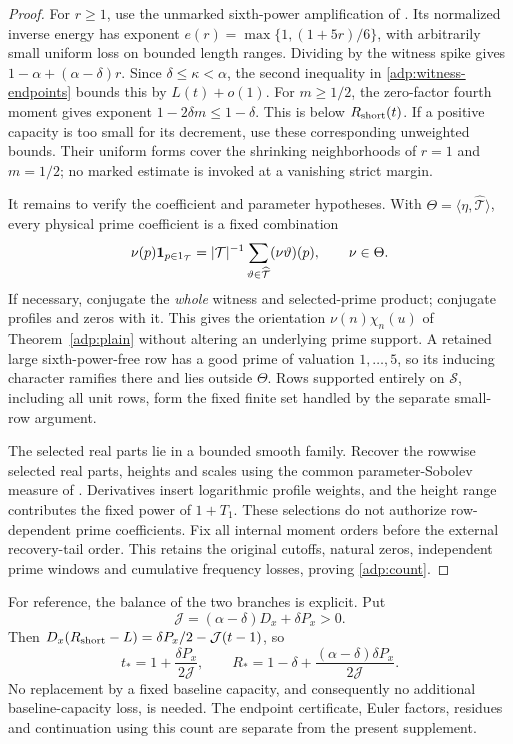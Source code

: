 \begin{proof}
For $r\ge1$, use the unmarked sixth-power amplification of
\cite[Lemma 17.6, (17.88)]{OAI26}. Its normalized inverse energy
has exponent $e(r)=\max\{1,(1+5r)/6\}$, with arbitrarily small
uniform loss on bounded length ranges. Dividing by the witness
spike gives $1-\alpha+(\alpha-\delta)r$.
Since $\delta\le\kappa<\alpha$, the second inequality in
\eqref{adp:witness-endpoints} bounds this by $L(t)+o(1)$.
For $m\ge1/2$, the zero-factor fourth moment gives exponent
$1-2\delta m\le1-\delta$. This is below $R_{\rm short}(t)$.
If a positive capacity is too small for its decrement, use these
corresponding unweighted bounds. Their uniform forms cover the
shrinking neighborhoods of $r=1$ and $m=1/2$; no marked estimate
is invoked at a vanishing strict margin.

It remains to verify the coefficient and parameter hypotheses.
With $\Theta=\langle\eta,\widehat{\mathcal T}\rangle$, every
physical prime coefficient is a fixed combination
\[
 \nu(p)\mathbf1_{p\in1_{\mathcal T}}
   =|\mathcal T|^{-1}
       \sum_{\vartheta\in\widehat{\mathcal T}}(\nu\vartheta)(p),
 \qquad \nu\in\Theta .
\]
If necessary, conjugate the \emph{whole} witness and selected-prime
product; conjugate profiles and zeros with it. This gives the
orientation $\nu(n)\chi_n(u)$ of Theorem~\ref{adp:plain} without
altering an underlying prime support. A retained large sixth-power-free
row has a good prime of valuation $1,\ldots,5$, so its inducing
character ramifies there and lies outside $\Theta$.
Rows supported entirely on $\mathcal S$, including all unit rows,
form the fixed finite set handled by the separate small-row argument.

The selected real parts lie in a bounded smooth family. Recover the
rowwise selected real parts, heights and scales using the common
parameter-Sobolev measure of \cite[Lemma 4.5 and Section 19.2]{OAI26}.
Derivatives insert logarithmic profile weights, and the height
range contributes the fixed power of $1+T_1$.
These selections do not authorize row-dependent prime coefficients.
Fix all internal moment orders before the external recovery-tail
order. This retains the original cutoffs, natural zeros, independent
prime windows and cumulative frequency losses, proving
\eqref{adp:count}.
\end{proof}

For reference, the balance of the two branches is explicit. Put
\[
 \mathcal J=(\alpha-\delta)D_x+\delta P_x>0 .
\]
Then $D_x(R_{\rm short}-L)=\delta P_x/2-\mathcal J(t-1)$, so
\[
 t_*=1+\frac{\delta P_x}{2\mathcal J},\qquad
 R_*=1-\delta+
       \frac{(\alpha-\delta)\delta P_x}{2\mathcal J}.
\]
No replacement by a fixed baseline capacity, and consequently no
additional baseline-capacity loss, is needed. The endpoint
certificate, Euler factors, residues and continuation using this
count are separate from the present supplement.

